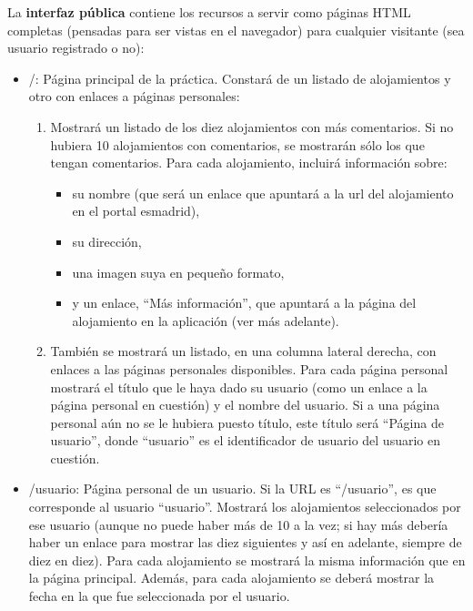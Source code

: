 La {\bf interfaz pública} contiene los recursos a servir como páginas HTML completas (pensadas para ser vistas en el navegador) para cualquier visitante (sea usuario registrado o no):

\begin{itemize}
  \item /: Página principal de la práctica. Constará de un listado de alojamientos y otro con enlaces a páginas personales:
  
  \begin{enumerate}
    \item Mostrará un listado de los diez alojamientos con más comentarios. Si no hubiera 10 alojamientos con comentarios, se mostrarán sólo los que tengan comentarios. Para cada alojamiento, incluirá información sobre:
    \begin{itemize}
      \item su nombre (que será un enlace que apuntará a la url del alojamiento en el portal esmadrid), 
      \item su dirección, 
      \item una imagen suya en pequeño formato, 
      \item y un enlace, ``Más información'', que apuntará a la página del alojamiento en la aplicación (ver más adelante).
    \end{itemize}
   
    \item También se mostrará un listado, en una columna lateral derecha, con enlaces a las páginas personales disponibles. Para cada página personal mostrará el título que le haya dado su usuario (como un enlace a la página personal en cuestión) y el nombre del usuario. Si a una página personal aún no se le hubiera puesto título, este título será ``Página de usuario'', donde ``usuario'' es el identificador de usuario del usuario en cuestión.
   \end{enumerate}

  \item /{usuario}: Página personal de un usuario. Si la URL es ``/usuario'', es que corresponde al usuario ``usuario''. Mostrará los alojamientos seleccionados por ese usuario (aunque no puede haber más de 10 a la vez; si hay más debería haber un enlace para mostrar las diez siguientes y así en adelante, siempre de diez en diez). Para cada alojamiento se mostrará la misma información que en la página principal. Además, para cada alojamiento se deberá mostrar la fecha en la que fue seleccionada por el usuario.


\end{itemize}
